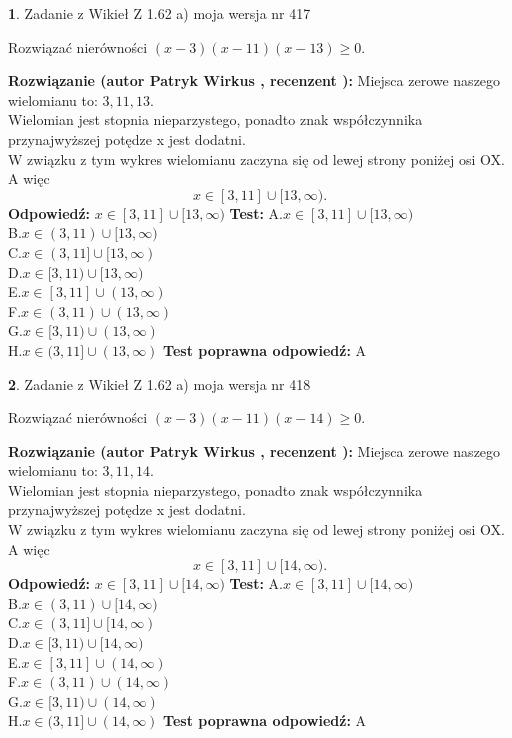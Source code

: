 \documentclass[12pt, a4paper]{article}
\theoremstyle{definition} %
\newtheorem{zad}{}
\newcommand{\zadStart}[1]{\begin{zad}#1\newline}
\newcommand{\zadStop}{\end{zad}}
\newcommand{\rozwStart}[2]{\noindent \textbf{Rozwiązanie (autor #1 , recenzent #2): }\newline}
\newcommand{\rozwStop}{\newline}
\newcommand{\odpStart}{\noindent \textbf{Odpowiedź:}\newline}
\newcommand{\odpStop}{\newline}
\newcommand{\testStart}{\noindent \textbf{Test:}\newline}
\newcommand{\testStop}{\newline}
\newcommand{\kluczStart}{\noindent \textbf{Test poprawna odpowiedź:}\newline}
\newcommand{\kluczStop}{\newline}
\begin{document}
\zadStart{Zadanie z Wikieł Z 1.62 a) moja wersja nr 417}

Rozwiązać nierówności $(x-3)(x-11)(x-13)\ge0$.
\zadStop
\rozwStart{Patryk Wirkus}{}
Miejsca zerowe naszego wielomianu to: $3, 11, 13$.\\
Wielomian jest stopnia nieparzystego, ponadto znak współczynnika przy\linebreak najwyższej potędze x jest dodatni.\\ W związku z tym wykres wielomianu zaczyna się od lewej strony poniżej osi OX. A więc $$x \in [3,11] \cup [13,\infty).$$
\rozwStop
\odpStart
$x \in [3,11] \cup [13,\infty)$
\odpStop
\testStart
A.$x \in [3,11] \cup [13,\infty)$\\
B.$x \in (3,11) \cup [13,\infty)$\\
C.$x \in (3,11] \cup [13,\infty)$\\
D.$x \in [3,11) \cup [13,\infty)$\\
E.$x \in [3,11] \cup (13,\infty)$\\
F.$x \in (3,11) \cup (13,\infty)$\\
G.$x \in [3,11) \cup (13,\infty)$\\
H.$x \in (3,11] \cup (13,\infty)$
\testStop
\kluczStart
A
\kluczStop



\zadStart{Zadanie z Wikieł Z 1.62 a) moja wersja nr 418}

Rozwiązać nierówności $(x-3)(x-11)(x-14)\ge0$.
\zadStop
\rozwStart{Patryk Wirkus}{}
Miejsca zerowe naszego wielomianu to: $3, 11, 14$.\\
Wielomian jest stopnia nieparzystego, ponadto znak współczynnika przy\linebreak najwyższej potędze x jest dodatni.\\ W związku z tym wykres wielomianu zaczyna się od lewej strony poniżej osi OX. A więc $$x \in [3,11] \cup [14,\infty).$$
\rozwStop
\odpStart
$x \in [3,11] \cup [14,\infty)$
\odpStop
\testStart
A.$x \in [3,11] \cup [14,\infty)$\\
B.$x \in (3,11) \cup [14,\infty)$\\
C.$x \in (3,11] \cup [14,\infty)$\\
D.$x \in [3,11) \cup [14,\infty)$\\
E.$x \in [3,11] \cup (14,\infty)$\\
F.$x \in (3,11) \cup (14,\infty)$\\
G.$x \in [3,11) \cup (14,\infty)$\\
H.$x \in (3,11] \cup (14,\infty)$
\testStop
\kluczStart
A
\kluczStop
\end{document}
